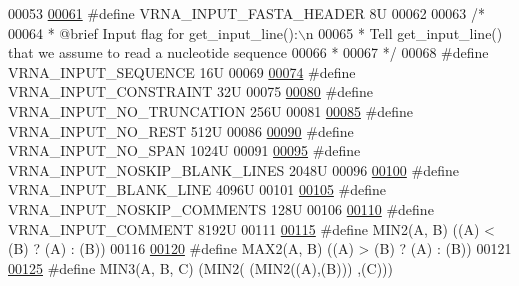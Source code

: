 \begin{DoxyCode}
00053 
\hyperlink{group__utils_ga2f0d8069e93d3ac54d9320d6bdb8e7e7}{00061} \textcolor{preprocessor}{#define VRNA\_INPUT\_FASTA\_HEADER           8U}
00062 
00063 \textcolor{comment}{/*}
00064 \textcolor{comment}{ *  @brief  Input flag for get\_input\_line():\(\backslash\)n}
00065 \textcolor{comment}{ *  Tell get\_input\_line() that we assume to read a nucleotide sequence}
00066 \textcolor{comment}{ * }
00067 \textcolor{comment}{ */}
00068 \textcolor{preprocessor}{#define VRNA\_INPUT\_SEQUENCE               16U}
00069 
\hyperlink{group__utils_gac08a9df45b9721b97a47dbfe7a6e5f85}{00074} \textcolor{preprocessor}{#define VRNA\_INPUT\_CONSTRAINT             32U}
00075 
\hyperlink{group__utils_ga086742158293217a46ae2f71bb296937}{00080} \textcolor{preprocessor}{#define VRNA\_INPUT\_NO\_TRUNCATION          256U}
00081 
\hyperlink{group__utils_ga7a2e8c50a0c7ce82e60da1016e1367fd}{00085} \textcolor{preprocessor}{#define VRNA\_INPUT\_NO\_REST                512U}
00086 
\hyperlink{group__utils_ga0de536599b881c787b0943a2671da476}{00090} \textcolor{preprocessor}{#define VRNA\_INPUT\_NO\_SPAN                1024U}
00091 
\hyperlink{group__utils_gab4db885222b3b69608310d7c7e63e286}{00095} \textcolor{preprocessor}{#define VRNA\_INPUT\_NOSKIP\_BLANK\_LINES     2048U}
00096 
\hyperlink{group__utils_ga305474b93ccb79ae4c7754016a8ddd84}{00100} \textcolor{preprocessor}{#define VRNA\_INPUT\_BLANK\_LINE             4096U}
00101 
\hyperlink{group__utils_ga0f6311f11bed1842e3a527ab27b294c6}{00105} \textcolor{preprocessor}{#define VRNA\_INPUT\_NOSKIP\_COMMENTS        128U}
00106 
\hyperlink{group__utils_gaf2062e0eeefffd3ed639af460b3d4fab}{00110} \textcolor{preprocessor}{#define VRNA\_INPUT\_COMMENT                8192U}
00111 
\hyperlink{group__utils_gae0b9cd0ce090bd69b951aa73e8fa4f7d}{00115} \textcolor{preprocessor}{#define MIN2(A, B)      ((A) < (B) ? (A) : (B))}
00116 
\hyperlink{group__utils_ga33297b3679c713b0c4d897cd0fe3b122}{00120} \textcolor{preprocessor}{#define MAX2(A, B)      ((A) > (B) ? (A) : (B))}
00121 
\hyperlink{group__utils_ga721b8d5f3abef17f10293f1f7f8c958e}{00125} \textcolor{preprocessor}{#define MIN3(A, B, C)   (MIN2(  (MIN2((A),(B))) ,(C)))}

\end{DoxyCode}

